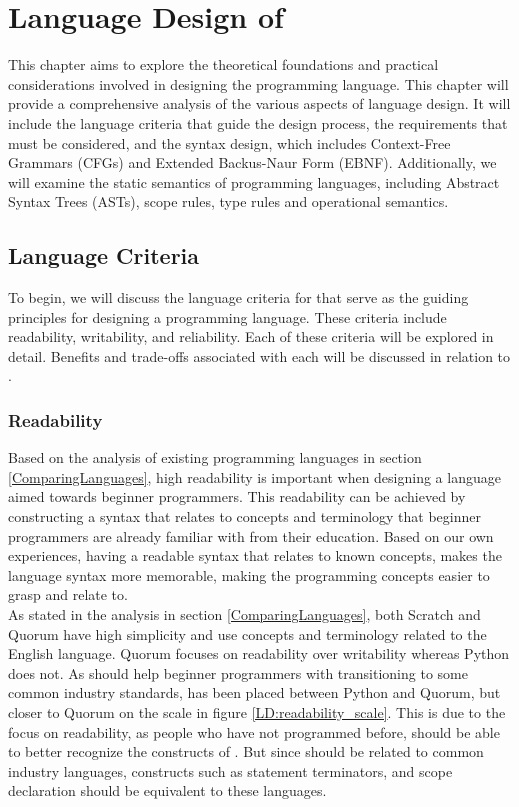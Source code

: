 \chapter{Language Design of \lang} \label{ch:language_design}

This chapter aims to explore the theoretical foundations and practical considerations involved in designing the \lang programming language. This chapter will provide a comprehensive analysis of the various aspects of language design. It will include the language criteria that guide the design process, the requirements that must be considered, and the syntax design, which includes Context-Free Grammars (CFGs) and Extended Backus-Naur Form (EBNF). Additionally, we will examine the static semantics of programming languages, including Abstract Syntax Trees (ASTs), scope rules, type rules and operational semantics. \\


\section{Language Criteria}\label{languageCriteriaForLang}
To begin, we will discuss the language criteria for \lang that serve as the guiding principles for designing a programming language. These criteria include readability, writability, and reliability. Each of these criteria will be explored in detail. Benefits and trade-offs associated with each will be discussed in relation to \lang.

\subsection{Readability} \label{Lang Readability}
Based on the analysis of existing programming languages in section \ref{ComparingLanguages}, high readability is important when designing a language aimed towards beginner programmers. This readability can be achieved by constructing a syntax that relates to concepts and terminology that beginner programmers are already familiar with from their education. Based on our own experiences, having a readable syntax that relates to known concepts, makes the language syntax more memorable, making the programming concepts easier to grasp and relate to.\\  

As stated in the analysis in section \ref{ComparingLanguages}, both Scratch and Quorum have high simplicity and use concepts and terminology related to the English language. Quorum focuses on readability over writability whereas Python does not. As \lang should help beginner programmers with transitioning to some common industry standards, \lang has been placed between Python and Quorum, but closer to Quorum on the scale in figure \ref{LD:readability_scale}. This is due to the focus on readability, as people who have not programmed before, should be able to better recognize the constructs of \lang. But since \lang should be related to common industry languages, constructs such as statement terminators, and scope declaration should be equivalent to these languages.\\  


